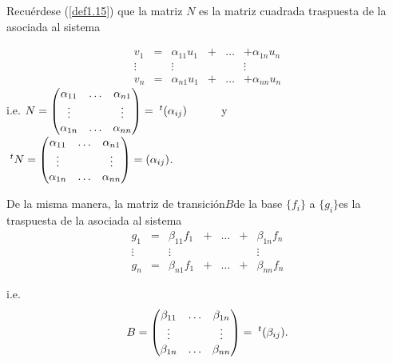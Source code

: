 		\begin{demo}
			\normalfont Recuérdese (\ref{def1.15}) que la matriz $ N $ es la matriz cuadrada traspuesta de la asociada al sistema
			
		\[ 	 \begin{matrix}
			v_{1}  & = & \alpha_{11}u_{1} & + & \ldots & + \alpha_{1n}u_{n} \\ \vdots &   &               \vdots        &     &               & \vdots \\
			v_{n}  & = & \alpha_{n1}u_{1} & + & \ldots & + \alpha_{nn}u_{n}
			\end{matrix}  \]
			  i.e. $ N = \left(\begin{matrix}
			  \alpha_{11} & \ldots &\alpha_{n1} \\ \vdots & & \vdots \\ \alpha_{1n} & \ldots &\alpha_{nn} 
			  \end{matrix}\right) = \textcolor{white}{.}^{t}(\alpha_{ij}) $ \textcolor{white}{space} y \textcolor{white}{space} $ \textcolor{white}{.}^{t}N = \left(\begin{matrix}
			  \alpha_{11} & \ldots &\alpha_{n1} \\ \vdots & & \vdots \\ \alpha_{1n} & \ldots &\alpha_{nn} 
			  \end{matrix}\right) = (\alpha_{ij}) $.
			
			De la misma manera, la matriz de transición$  B  $de la base $ \{f_{i}\} $ a $ \{g_{i}\}  $es la traspuesta de la asociada al sistema
				\[ \begin{matrix}
			g_{1} & = & \beta_{11}f_{1} & + & \ldots & + & \beta_{1n}f_{n}\\
			\vdots &   & \vdots                 &      &             &      & \vdots \\
			g_{n} & = & \beta_{n1}f_{1} & + & \ldots & + & \beta_{nn}f_{n}
			\end{matrix} \]
		\end{demo}
		i.e. \[ B = \left(\begin{matrix}
			\beta_{11} & \ldots & \beta_{1n} \\ \vdots &  & \vdots \\ \beta_{1n} & \ldots & \beta_{nn}
		\end{matrix}\right) = \textcolor{white}{.}^{t}(\beta_{ij}).\]
		
